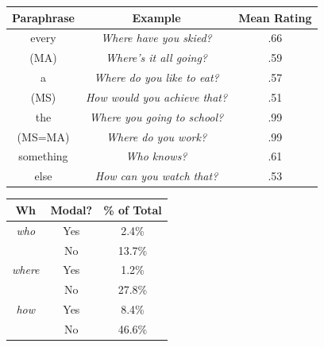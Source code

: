 \newpage


\noindent
\begin{minipage}{0.6\linewidth}
\begin{tabular}{@{}|c|c|c|}
    \hline
    \textbf{Paraphrase} & \textbf{Example} & \textbf{Mean Rating}\\
    \hline
    \hline
    every & \emph{Where have you skied?} & .66\\
    (MA) & \emph{Where's it all going?} & .59 \\
    \hline
    a & \emph{Where do you like to eat?} & .57\\
    (MS) & \emph{How would you achieve that?} & .51\\
    \hline
    the & \emph{Where you going to school?} & .99\\
    (MS=MA) & \emph{Where do you work?} & .99\\
    \hline
    something & \emph{Who knows?} & .61\\
    else & \emph{How can you watch that?} & .53\\
    \hline
\end{tabular}
\vspace{-.3cm}
\label{tab:exs}
\end{minipage}
\hfill
\begin{minipage}{0.34\linewidth}
    \centering
    \begin{tabular}{@{}|c|c|c|}
    \hline
    \textbf{Wh} & \textbf{Modal?} & \textbf{\% of Total}\\
    \hline
    \hline
    \emph{who}  & Yes & 2.4\% \\
    {} & No & 13.7\%\\
    \hline
    \emph{where} & Yes & 1.2\%\\
    {} & No & 27.8\%\\
    \hline
    \emph{how} & Yes & 8.4\%\\
    {} & No & 46.6\%\\
    \hline
    \end{tabular}
    \label{dist}
\end{minipage}
\vspace{-.1cm}
